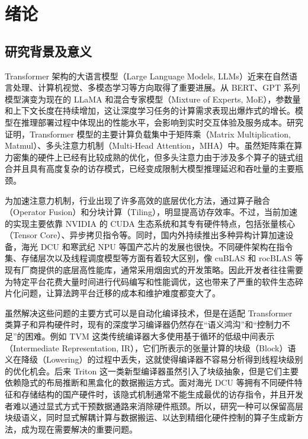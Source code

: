
\chapter{绪论}
\section{研究背景及意义}

Transformer 架构的大语言模型（Large Language Models, LLMs）近来在自然语言处理、计算机视觉、多模态学习等方向取得了重要进展。从 BERT、GPT 系列模型演变为现在的 LLaMA 和混合专家模型（Mixture of Experts, MoE），参数量和上下文长度在持续增加，这让深度学习任务的计算需求表现出爆炸式的增长。模型在推理部署过程中体现出的性能水平，会影响到实时交互体验及服务成本。研究证明，Transformer 模型的主要计算负载集中于矩阵乘（Matrix Multiplication, Matmul）、多头注意力机制（Multi-Head Attention，MHA）中。虽然矩阵乘在算力密集的硬件上已经有比较成熟的优化，但多头注意力由于涉及多个算子的链式组合并且具有高度复杂的访存模式，已经变成限制大模型推理延迟和吞吐量的主要瓶颈。

为加速注意力机制，行业出现了许多高效的底层优化方法，通过算子融合（Operator Fusion）和分块计算（Tiling），明显提高访存效率。不过，当前加速的实现主要依靠 NVIDIA 的 CUDA 生态系统和其专有硬件特点，包括张量核心（Tensor Core）、异步拷贝指令等。同时，国内外持续推出多种异构计算加速设备，海光 DCU 和寒武纪 NPU 等国产芯片的发展也很快。不同硬件架构在指令集、存储层次以及线程调度模型等方面有着较大区别，像 cuBLAS 和 rocBLAS 等现有厂商提供的底层高性能库，通常采用烟囱式的开发策略。因此开发者往往需要为特定平台花费大量时间进行代码编写和性能调优，这也带来了严重的软件生态碎片化问题，让算法跨平台迁移的成本和维护难度都变大了。

虽然解决这些问题的主要方式可以是自动化编译技术，但是在适配 Transformer 类算子和异构硬件时，现有的深度学习编译器仍然存在“语义鸿沟”和“控制力不足”的困难。例如 TVM 这类传统编译器大多使用基于循环的低级中间表示（Intermediate Representation, IR），它们所表示的张量计算的块级（Block）语义在降级（Lowering）的过程中丢失，这就使得编译器不容易分析得到线程块级别的优化机会。后来 Triton 这一类新型编译器虽然引入了块级抽象，但是它们主要依赖隐式的布局推断和黑盒化的数据搬运方式。面对海光 DCU 等拥有不同硬件特征和存储结构的国产硬件时，该隐式机制通常不能生成最优的访存指令，并且开发者难以通过显式方式干预数据通路来消除硬件瓶颈。所以，研究一种可以保留高层块级语义，同时显式解耦计算与数据搬运、以达到精细化硬件控制的算子生成新方法，成为现在需要解决的重要问题。


